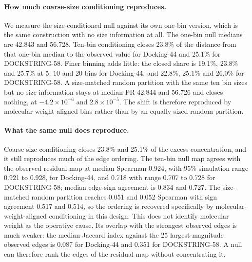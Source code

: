 \paragraph{How much coarse-size conditioning reproduces.} We measure the size-conditioned null against its own
one-bin version, which is the same construction with no size information at all. The one-bin
null medians are 42.843 and 56.728. Ten-bin conditioning closes 23.8\% of the distance from
that one-bin median to the observed value for Docking-44 and 25.1\% for DOCKSTRING-58. Finer
binning adds little: the closed share is 19.1\%, 23.8\% and 25.7\% at 5, 10 and 20 bins for
Docking-44, and 22.8\%, 25.1\% and 26.0\% for DOCKSTRING-58. A size-matched random partition
with the same ten bin sizes but no size information stays at median PR 42.844 and 56.726 and
closes nothing, at $-4.2\times10^{-6}$ and $2.8\times10^{-5}$. The shift is therefore reproduced
by molecular-weight-aligned bins rather than by an equally sized random partition.

\paragraph{What the same null does reproduce.} Coarse-size conditioning closes 23.8\% and 25.1\% of
the excess concentration, and it still reproduces much of the edge ordering. The ten-bin null map
agrees with the observed residual map at median Spearman 0.924, with 95\% simulation range
0.921 to 0.928, for Docking-44, and 0.718 with range 0.707 to 0.728 for DOCKSTRING-58; median
edge-sign agreement is 0.834 and 0.727. The size-matched random partition reaches 0.051 and
0.052 Spearman with sign agreement 0.517 and 0.514, so the ordering is recovered specifically by
molecular-weight-aligned conditioning in this design. This does not identify molecular weight as
the operative cause. Its overlap with the strongest observed edges is much
weaker: the median Jaccard index against the 25 largest-magnitude observed edges is 0.087 for
Docking-44 and 0.351 for DOCKSTRING-58. A null can therefore rank the edges of the residual map
without concentrating it.
